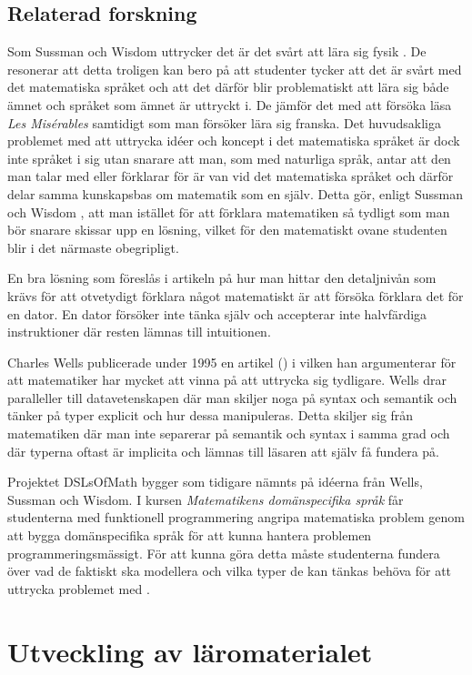 \documentclass[]{article}
\begin{document}
\subsection{Relaterad forskning}
Som Sussman och Wisdom uttrycker det är det svårt att lära sig fysik
\cite{sussman2002role}. De resonerar att detta troligen kan bero på att
studenter tycker att det är svårt med det matematiska språket och att det
därför blir problematiskt att lära sig både ämnet och språket som ämnet är
uttryckt i. De jämför det med att försöka läsa \textit{Les Misérables}
samtidigt som man försöker lära sig franska. Det huvudsakliga problemet med att
uttrycka idéer och koncept i det matematiska språket är dock inte språket i sig
utan snarare att man, som med naturliga språk, antar att den man talar med
eller förklarar för är van vid det matematiska språket och därför delar
samma kunskapsbas om matematik som en själv. Detta gör, enligt Sussman och
Wisdom \cite{sussman2002role}, att man istället för att förklara matematiken
så tydligt som man bör snarare skissar upp en lösning, vilket för den
matematiskt ovane studenten blir i det närmaste obegripligt.

En bra lösning som föreslås i artikeln på hur man hittar den detaljnivån som
krävs för att otvetydigt förklara något matematiskt är att försöka förklara
det för en dator. En dator försöker inte tänka själv och accepterar inte
halvfärdiga instruktioner där resten lämnas till intuitionen.

Charles Wells publicerade under 1995 en artikel (\cite{wells1995communicating})
i vilken han argumenterar för att matematiker har mycket att vinna på att
uttrycka  sig tydligare. Wells drar paralleller till datavetenskapen där man
skiljer noga på syntax och semantik och tänker på typer explicit och hur dessa
manipuleras. Detta skiljer sig från matematiken där man inte separerar på
semantik och syntax i samma grad och där typerna oftast är implicita och lämnas
till läsaren att själv få fundera på.

Projektet DSLsOfMath bygger som tidigare nämnts på idéerna från Wells, Sussman
och Wisdom. I kursen \textit{Matematikens domänspecifika språk} får studenterna
med funktionell programmering angripa matematiska problem genom att bygga
domänspecifika språk för att kunna hantera problemen programmeringsmässigt.
För att kunna göra detta måste studenterna fundera över vad de faktiskt ska
modellera och vilka typer de kan tänkas behöva för att uttrycka problemet med
\cite{kursplan:dslsofmath}.

\section{Utveckling av läromaterialet}
\end{document}

